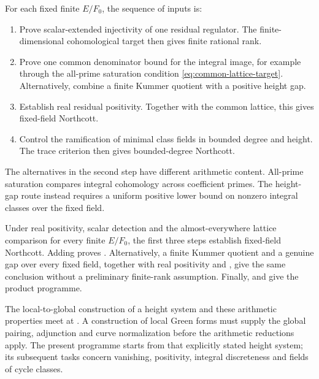 \documentclass[11pt,a4paper]{article}
\theoremstyle{definition}
\numberwithin{equation}{section}
\begin{document}
For each fixed finite \(E/F_0\), the sequence of inputs is:
\begin{enumerate}
\item Prove scalar-extended injectivity of one residual
regulator. The finite-dimensional cohomological target then
gives finite rational rank.
\item Prove one common denominator bound for the integral
image, for example through the all-prime saturation
condition \eqref{eq:common-lattice-target}. Alternatively,
combine a finite Kummer quotient with a positive height gap.
\item Establish real residual positivity. Together with
the common lattice, this gives fixed-field Northcott.
\item Control the ramification of minimal class fields in
bounded degree and height. The trace criterion then gives
bounded-degree Northcott.
\end{enumerate}
The alternatives in the second step have different
arithmetic content. All-prime saturation compares integral
cohomology across coefficient primes. The height-gap
route instead requires a uniform positive lower bound on
nonzero integral classes over the fixed field.

Under real positivity, scalar detection and the
almost-everywhere lattice comparison for every finite
\(E/F_0\), the first three steps establish fixed-field
Northcott. Adding  proves
. Alternatively, a finite
Kummer quotient and a genuine gap over every fixed field,
together with real positivity and
, give the same conclusion without
a preliminary finite-rank assumption. Finally,
 and
 give the product programme.

The local-to-global construction of a height system and
these arithmetic properties meet at .
A construction of local Green forms must supply the
global pairing, adjunction and curve normalization before
the arithmetic reductions apply. The present programme
starts from that explicitly stated height system; its
subsequent tasks concern vanishing, positivity, integral
discreteness and fields of cycle classes.
\end{document}
